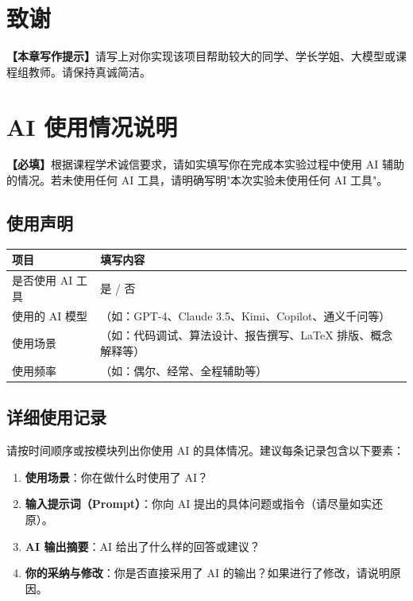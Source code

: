 \documentclass[12pt,hyperref,a4paper,UTF8]{ctexart}
\begin{document}
\section*{致谢}

\textbf{【本章写作提示】}请写上对你实现该项目帮助较大的同学、学长学姐、大模型或课程组教师。请保持真诚简洁。

\newpage
\appendix
\section{AI 使用情况说明}

\textbf{【必填】}根据课程学术诚信要求，请如实填写你在完成本实验过程中使用 AI 辅助的情况。若未使用任何 AI 工具，请明确写明"本次实验未使用任何 AI 工具"。

\subsection{使用声明}

\begin{table}[!htbp]
    \centering
    \begin{tabular}{|p{4cm}|p{9cm}|}
    \hline
    \textbf{项目} & \textbf{填写内容} \\
    \hline
    是否使用 AI 工具 & 是 / 否 \\
    \hline
    使用的 AI 模型 & （如：GPT-4、Claude 3.5、Kimi、Copilot、通义千问等） \\
    \hline
    使用场景 & （如：代码调试、算法设计、报告撰写、LaTeX 排版、概念解释等） \\
    \hline
    使用频率 & （如：偶尔、经常、全程辅助等） \\
    \hline
    \end{tabular}
\end{table}

\subsection{详细使用记录}

请按时间顺序或按模块列出你使用 AI 的具体情况。建议每条记录包含以下要素：
\begin{enumerate}
    \item \textbf{使用场景}：你在做什么时使用了 AI？
    \item \textbf{输入提示词（Prompt）}：你向 AI 提出的具体问题或指令（请尽量如实还原）。
    \item \textbf{AI 输出摘要}：AI 给出了什么样的回答或建议？
    \item \textbf{你的采纳与修改}：你是否直接采用了 AI 的输出？如果进行了修改，请说明原因。
\end{enumerate}
\end{document}
